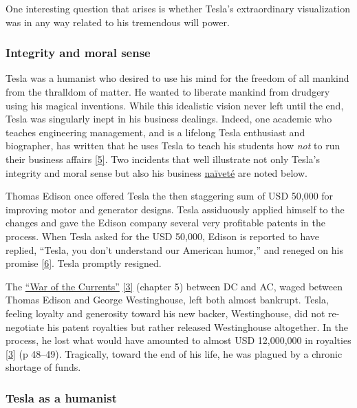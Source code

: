 \documentclass[
  a4paper,
]{article}
\begin{document}
One interesting question that arises is whether Tesla's extraordinary
visualization was in any way related to his tremendous will power.

\hypertarget{integrity-and-moral-sense}{%
\subsubsection{Integrity and moral
sense}\label{integrity-and-moral-sense}}

Tesla was a humanist who desired to use his mind for the freedom of all
mankind from the thralldom of matter. He wanted to liberate mankind from
drudgery using his magical inventions. While this idealistic vision
never left until the end, Tesla was singularly inept in his business
dealings. Indeed, one academic who teaches engineering management, and
is a lifelong Tesla enthusiast and biographer, has written that he uses
Tesla to teach his students how \emph{not} to run their business affairs
\protect\hyperlink{ref-lomas99}{{[}5{]}}. Two incidents that well
illustrate not only Tesla's integrity and moral sense but also his
business \href{https://www.thefreedictionary.com/naivete}{naïveté} are
noted below.

Thomas Edison once offered Tesla the then staggering sum of USD 50,000
for improving motor and generator designs. Tesla assiduously applied
himself to the changes and gave the Edison company several very
profitable patents in the process. When Tesla asked for the USD 50,000,
Edison is reported to have replied, ``Tesla, you don't understand our
American humor,'' and reneged on his promise
\protect\hyperlink{ref-tesla-wiki}{{[}6{]}}. Tesla promptly resigned.

The \href{https://en.wikipedia.org/wiki/War_of_the_currents}{``War of
the Currents''} \protect\hyperlink{ref-cheney81}{{[}3{]}} (chapter 5)
between DC and AC, waged between Thomas Edison and George Westinghouse,
left both almost bankrupt. Tesla, feeling loyalty and generosity toward
his new backer, Westinghouse, did not re-negotiate his patent royalties
but rather released Westinghouse altogether. In the process, he lost
what would have amounted to almost USD 12,000,000 in royalties
\protect\hyperlink{ref-cheney81}{{[}3{]}} (p 48--49). Tragically, toward
the end of his life, he was plagued by a chronic shortage of funds.

\hypertarget{tesla-as-a-humanist}{%
\subsubsection{Tesla as a humanist}\label{tesla-as-a-humanist}}
\end{document}
